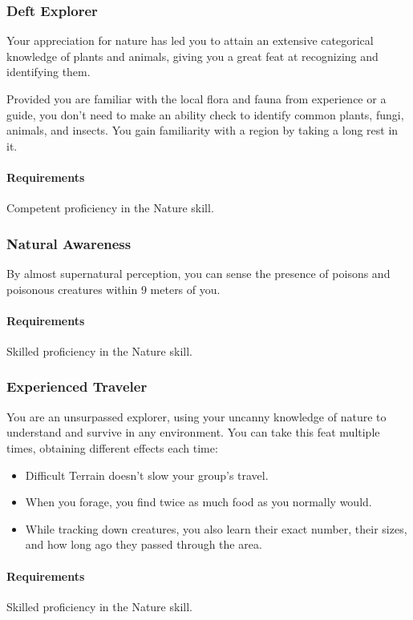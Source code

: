\subsubsection{Deft Explorer} \label{feat::deftexplorer}
    Your appreciation for nature has led you to attain an extensive categorical knowledge of plants and animals, giving you a great feat at recognizing and identifying them.

    Provided you are familiar with the local flora and fauna from experience or a guide, you don't need to make an ability check to identify common plants, fungi, animals, and insects.
    You gain familiarity with a region by taking a long rest in it.
    \paragraph{Requirements} Competent proficiency in the Nature skill.
\subsubsection{Natural Awareness} \label{feat::naturalawareness}
    By almost supernatural perception, you can sense the presence of poisons and poisonous creatures within 9 meters of you.

    \paragraph{Requirements} Skilled proficiency in the Nature skill.
\subsubsection{Experienced Traveler} \label{feat::experiencedtraveler}
    You are an unsurpassed explorer, using your uncanny knowledge of nature to understand and survive in any environment.
    You can take this feat multiple times, obtaining different effects each time:
    \begin{itemize}
        \item Difficult Terrain doesn't slow your group's travel.
        \item When you forage, you find twice as much food as you normally would.
        \item While tracking down creatures, you also learn their exact number, their sizes, and how long ago they passed through the area.
    \end{itemize}
    \paragraph{Requirements} Skilled proficiency in the Nature skill.
